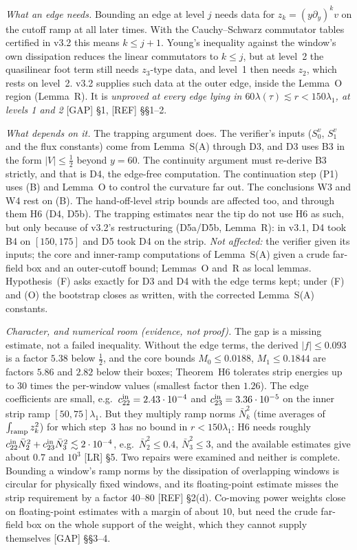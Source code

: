 \documentclass[11pt]{amsart}
\theoremstyle{definition}
\theoremstyle{remark}
\newcommand{\dref}[1]{[\textsf{#1}]}
\begin{document}
\emph{What an edge needs.} Bounding an edge at level $j$ needs data for $z_k=(y\partial_y)^kv$ on the cutoff ramp at all later times. With the Cauchy--Schwarz commutator tables certified in v3.2 this means $k\le j+1$. Young's inequality against the window's own dissipation reduces the linear commutators to $k\le j$, but at level~2 the quasilinear foot term still needs $z_3$-type data, and level~1 then needs $z_2$, which rests on level~2. v3.2 supplies such data at the outer edge, inside the Lemma~O region (Lemma~R). It is \emph{unproved at every edge lying in $60\lambda(\tau)\lesssim r<150\lambda_1$, at levels 1 and 2} \dref{GAP} \S1, \dref{REF} \S\S1--2.

\emph{What depends on it.} The trapping argument does. The verifier's inputs ($S_0^v$, $S_1^v$ and the flux constants) come from Lemma~S(A) through D3, and D3 uses B3 in the form $|V|\le\frac12$ beyond $y=60$. The continuity argument must re-derive B3 strictly, and that is D4, the edge-free computation. The continuation step (P1) uses (B) and Lemma~O to control the curvature far out. The conclusions W3 and W4 rest on (B). The hand-off-level strip bounds are affected too, and through them H6 (D4, D5b). The trapping estimates near the tip do not use H6 as such, but only because of v3.2's restructuring (D5a/D5b, Lemma~R): in v3.1, D4 took B4 on $[150,175]$ and D5 took D4 on the strip. \emph{Not affected:} the verifier given its inputs; the core and inner-ramp computations of Lemma~S(A) given a crude far-field box and an outer-cutoff bound; Lemmas~O and~R as local lemmas. Hypothesis~(F) asks exactly for D3 and D4 with the edge terms kept; under (F) and (O) the bootstrap closes as written, with the corrected Lemma~S(A) constants.

\emph{Character, and numerical room (evidence, not proof).} The gap is a missing estimate, not a failed inequality. Without the edge terms, the derived $|f|\le0.093$ is a factor $5.38$ below $\frac12$, and the core bounds $M_0\le0.0188$, $M_1\le0.1844$ are factors $5.86$ and $2.82$ below their boxes; Theorem~H6 tolerates strip energies up to $30$ times the per-window values (smallest factor then $1.26$). The edge coefficients are small, e.g.\ $c^{\rm in}_{22}=2.43\cdot10^{-4}$ and $c^{\rm in}_{23}=3.36\cdot10^{-5}$ on the inner strip ramp $[50,75]\lambda_1$. But they multiply ramp norms $\bar N_k^2$ (time averages of $\int_{\rm ramp}z_k^2$) for which step~3 has no bound in $r<150\lambda_1$: H6 needs roughly $c^{\rm in}_{22}\bar N_2^2+c^{\rm in}_{23}\bar N_3^2\lesssim2\cdot10^{-4}$, e.g.\ $\bar N_2^2\le0.4$, $\bar N_3^2\le3$, and the available estimates give about $0.7$ and $10^3$ \dref{LR} \S5. Two repairs were examined and neither is complete. Bounding a window's ramp norms by the dissipation of overlapping windows is circular for physically fixed windows, and its floating-point estimate misses the strip requirement by a factor 40--80 \dref{REF} \S2(d). Co-moving power weights close on floating-point estimates with a margin of about $10$, but need the crude far-field box on the whole support of the weight, which they cannot supply themselves \dref{GAP} \S\S3--4.
\end{document}
